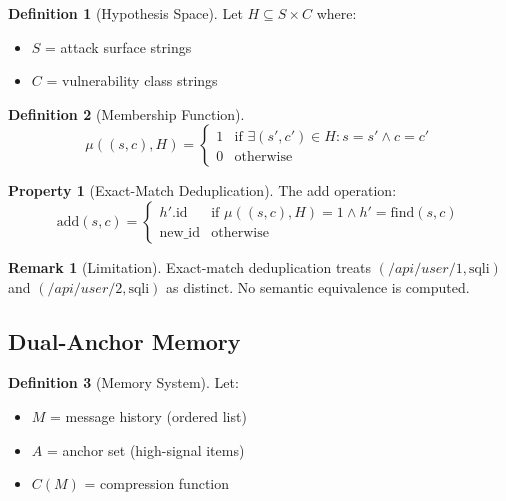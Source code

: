 \documentclass[11pt,a4paper]{article}
\theoremstyle{definition}
\newtheorem{definition}{Definition}[section]
\newtheorem{property}{Property}[section]
\newtheorem{remark}{Remark}[section]
\begin{document}
\begin{definition}[Hypothesis Space]
Let $H \subseteq S \times C$ where:
\begin{itemize}[leftmargin=*]
    \item $S$ = attack surface strings
    \item $C$ = vulnerability class strings
\end{itemize}
\end{definition}

\begin{definition}[Membership Function]
\begin{equation}
\mu((s, c), H) = \begin{cases} 1 & \text{if } \exists (s', c') \in H : s = s' \land c = c' \\ 0 & \text{otherwise} \end{cases}
\end{equation}
\end{definition}

\begin{property}[Exact-Match Deduplication]
The add operation:
\begin{equation}
\text{add}(s, c) = \begin{cases} h'.\text{id} & \text{if } \mu((s, c), H) = 1 \land h' = \text{find}(s, c) \\ \text{new\_id} & \text{otherwise} \end{cases}
\end{equation}
\end{property}

\begin{remark}[Limitation]
Exact-match deduplication treats $(/api/user/1, \text{sqli})$ and $(/api/user/2, \text{sqli})$ as distinct. No semantic equivalence is computed.
\end{remark}

\subsection{Dual-Anchor Memory}

\begin{definition}[Memory System]
Let:
\begin{itemize}[leftmargin=*]
    \item $M$ = message history (ordered list)
    \item $A$ = anchor set (high-signal items)
    \item $C(M)$ = compression function
\end{itemize}
\end{definition}
\end{document}
